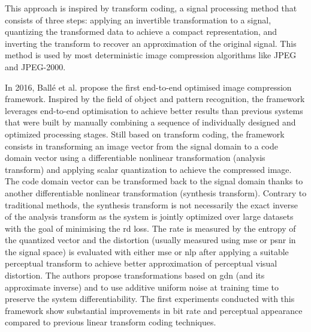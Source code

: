 \documentclass{article}
\begin{document}
This approach is inspired by transform coding, a signal processing method that consists of three steps: applying an invertible transformation to a signal, quantizing the transformed data to achieve a compact representation, and inverting the transform to recover an approximation of the original signal. This method is used by most deterministic image compression algorithms like JPEG and JPEG-2000.

In 2016, Ballé et al. \cite{balle2016endtoendoptimizationnonlineartransform} propose the first end-to-end optimised image compression framework. Inspired by the field of object and pattern recognition, the framework leverages end-to-end optimisation to achieve better results than previous systems that were built by manually combining a sequence of individually designed and optimized processing stages. Still based on transform coding, the framework consists in transforming an image vector from the signal domain to a code domain vector using a differentiable nonlinear transformation (analysis transform) and applying scalar quantization to achieve the compressed image. The code domain vector can be transformed back to the signal domain thanks to another differentiable nonlinear transformation (synthesis transform). Contrary to traditional methods, the synthesis transform is not necessarily the exact inverse of the analysis transform as the system is jointly optimized over large datasets with the goal of minimising the \acrshort{rd} loss. The rate is measured by the entropy of the quantized vector and the distortion (usually measured using \acrfull{mse} or \acrfull{psnr} in the signal space) is evaluated with either \acrshort{mse} or \acrfull{nlp} after applying a suitable perceptual transform to achieve better approximation of perceptual visual distortion. The authors propose transformations based on \acrfull{gdn} (and its approximate inverse) and to use additive uniform noise at training time to preserve the system differentiability. The first experiments conducted with this framework show substantial improvements in bit rate and perceptual appearance compared to previous linear transform coding techniques.
\end{document}

